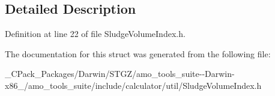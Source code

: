 \subsection{Detailed Description}


Definition at line 22 of file Sludge\+Volume\+Index.\+h.



The documentation for this struct was generated from the following file\+:\begin{DoxyCompactItemize}
\item 
\+\_\+\+C\+Pack\+\_\+\+Packages/\+Darwin/\+S\+T\+G\+Z/amo\+\_\+tools\+\_\+suite-\/-\/\+Darwin-\/x86\+\_/amo\+\_\+tools\+\_\+suite/include/calculator/util/Sludge\+Volume\+Index.\+h\end{DoxyCompactItemize}
